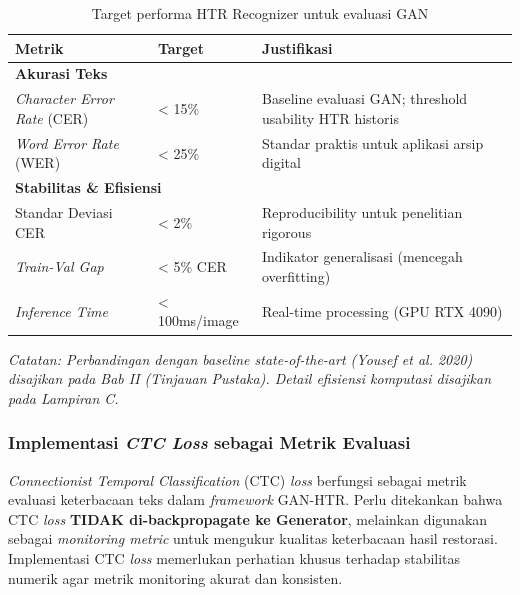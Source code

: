 \documentclass[12pt,a4paper]{article}
\begin{document}
\begin{table}[H]
\centering
\caption{Target performa HTR Recognizer untuk evaluasi GAN}
\label{tab:recognizer-performance-targets}
\small
\begin{tabular}{|l|l|p{6.5cm}|}
\hline
\textbf{Metrik} & \textbf{Target} & \textbf{Justifikasi} \\ \hline
\multicolumn{3}{|l|}{\textbf{Akurasi Teks}} \\ \hline
\textit{Character Error Rate} (CER) & < 15\% & Baseline evaluasi GAN; threshold usability HTR historis \\ \hline
\textit{Word Error Rate} (WER) & < 25\% & Standar praktis untuk aplikasi arsip digital \\ \hline
\multicolumn{3}{|l|}{\textbf{Stabilitas \& Efisiensi}} \\ \hline
Standar Deviasi CER & < 2\% & Reproducibility untuk penelitian rigorous \\ \hline
\textit{Train-Val Gap} & < 5\% CER & Indikator generalisasi (mencegah overfitting) \\ \hline
\textit{Inference Time} & < 100ms/image & Real-time processing (GPU RTX 4090) \\ \hline
\end{tabular}
\end{table}

\textit{Catatan: Perbandingan dengan baseline state-of-the-art (Yousef et al. 2020) disajikan pada Bab II (Tinjauan Pustaka). Detail efisiensi komputasi disajikan pada Lampiran C.}

\subsubsection{Implementasi \textit{CTC Loss} sebagai Metrik Evaluasi}
\textit{Connectionist Temporal Classification} (CTC) \textit{loss} berfungsi sebagai metrik evaluasi keterbacaan teks dalam \textit{framework} GAN-HTR. Perlu ditekankan bahwa CTC \textit{loss} \textbf{TIDAK di-backpropagate ke Generator}, melainkan digunakan sebagai \textit{monitoring metric} untuk mengukur kualitas keterbacaan hasil restorasi. Implementasi CTC \textit{loss} memerlukan perhatian khusus terhadap stabilitas numerik agar metrik monitoring akurat dan konsisten.
\end{document}
